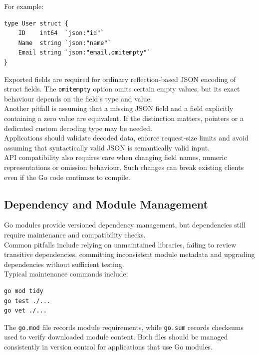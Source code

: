 For example:

\begin{lstlisting}
type User struct {
    ID    int64  `json:"id"`
    Name  string `json:"name"`
    Email string `json:"email,omitempty"`
}
\end{lstlisting}

Exported fields are required for ordinary reflection-based JSON encoding of struct fields. The \texttt{omitempty} option omits certain empty values, but its exact behaviour depends on the field's type and value.\\

Another pitfall is assuming that a missing JSON field and a field explicitly containing a zero value are equivalent. If the distinction matters, pointers or a dedicated custom decoding type may be needed.\\

Applications should validate decoded data, enforce request-size limits and avoid assuming that syntactically valid JSON is semantically valid input.\\

API compatibility also requires care when changing field names, numeric representations or omission behaviour. Such changes can break existing clients even if the Go code continues to compile.

\subsection{Dependency and Module Management}

Go modules provide versioned dependency management, but dependencies still require maintenance and compatibility checks.\\

Common pitfalls include relying on unmaintained libraries, failing to review transitive dependencies, committing inconsistent module metadata and upgrading dependencies without sufficient testing.\\

Typical maintenance commands include:

\begin{lstlisting}
go mod tidy
go test ./...
go vet ./...
\end{lstlisting}

The \texttt{go.mod} file records module requirements, while \texttt{go.sum} records checksums used to verify downloaded module content. Both files should be managed consistently in version control for applications that use Go modules.\\

